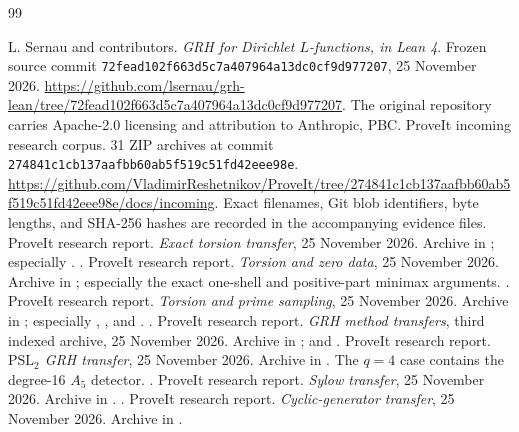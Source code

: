 \begin{thebibliography}{99}
L. Sernau and contributors.
\emph{GRH for Dirichlet \(L\)-functions, in Lean 4}.
Frozen source commit \texttt{72fead102f663d5c7a407964a13dc0cf9d977207}, 25 November 2026.
\url{https://github.com/lsernau/grh-lean/tree/72fead102f663d5c7a407964a13dc0cf9d977207}.
The original repository carries Apache-2.0 licensing and attribution to Anthropic, PBC.
ProveIt incoming research corpus.
31 ZIP archives at commit \texttt{274841c1cb137aafbb60ab5f519c51fd42eee98e}.
\url{https://github.com/VladimirReshetnikov/ProveIt/tree/274841c1cb137aafbb60ab5f519c51fd42eee98e/docs/incoming}.
Exact filenames, Git blob identifiers, byte lengths, and SHA-256 hashes are recorded in the accompanying evidence files.
ProveIt research report.
\emph{Exact torsion transfer}, 25 November 2026.
Archive  in \cite{corpus};
especially .
.
ProveIt research report.
\emph{Torsion and zero data}, 25 November 2026.
Archive  in \cite{corpus};
especially the exact one-shell and positive-part minimax arguments.
.
ProveIt research report.
\emph{Torsion and prime sampling}, 25 November 2026.
Archive  in \cite{corpus};
especially , , and .
.
ProveIt research report.
\emph{GRH method transfers}, third indexed archive, 25 November 2026.
Archive  in \cite{corpus};
 and .
ProveIt research report.
\emph{\(\mathrm{PSL}_2\) GRH transfer}, 25 November 2026.
Archive  in \cite{corpus}.
The \(q=4\) case contains the degree-16 \(A_5\) detector.
.
ProveIt research report.
\emph{Sylow transfer}, 25 November 2026.
Archive  in \cite{corpus}.
.
ProveIt research report.
\emph{Cyclic-generator transfer}, 25 November 2026.
Archive  in \cite{corpus}.

\end{thebibliography}
